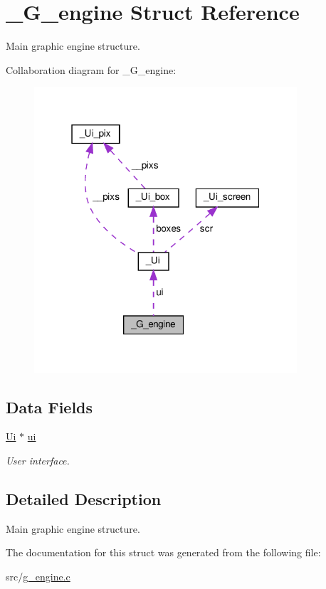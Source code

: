 \hypertarget{struct__G__engine}{}\section{\+\_\+\+G\+\_\+engine Struct Reference}
\label{struct__G__engine}


Main graphic engine structure.  




Collaboration diagram for \+\_\+\+G\+\_\+engine\+:\nopagebreak
\begin{figure}[H]
\begin{center}
\leavevmode
\includegraphics[width=277pt]{struct__G__engine__coll__graph}
\end{center}
\end{figure}
\subsection*{Data Fields}
\begin{DoxyCompactItemize}
\item 
\mbox{\label{struct__G__engine_abf87df76723f99d4d39a4d5f629777cb}} 
\hyperlink{struct__Ui}{Ui} $\ast$ \hyperlink{struct__G__engine_abf87df76723f99d4d39a4d5f629777cb}{ui}
\begin{DoxyCompactList}\small\item\em User interface. \end{DoxyCompactList}\end{DoxyCompactItemize}


\subsection{Detailed Description}
Main graphic engine structure. 

The documentation for this struct was generated from the following file\+:\begin{DoxyCompactItemize}
\item 
src/\hyperlink{g__engine_8c}{g\+\_\+engine.\+c}\end{DoxyCompactItemize}
